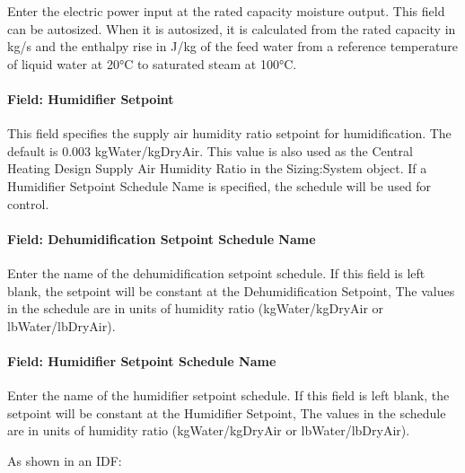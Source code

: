 Enter the electric power input at the rated capacity moisture output. This field can be autosized. When it is autosized, it is calculated from the rated capacity in kg/s and the enthalpy rise in J/kg of the feed water from a reference temperature of liquid water at 20°C to saturated steam at 100°C.

\paragraph{Field: Humidifier Setpoint}\label{field-humidifier-setpoint-4}

This field specifies the supply air humidity ratio setpoint for humidification. The default is 0.003 kgWater/kgDryAir. This value is also used as the Central Heating Design Supply Air Humidity Ratio in the Sizing:System object. If a Humidifier Setpoint Schedule Name is specified, the schedule will be used for control.

\paragraph{Field: Dehumidification Setpoint Schedule Name}\label{field-dehumidification-setpoint-schedule-name}

Enter the name of the dehumidification setpoint schedule. If this field is left blank, the setpoint will be constant at the Dehumidification Setpoint, The values in the schedule are in units of humidity ratio (kgWater/kgDryAir or lbWater/lbDryAir).

\paragraph{Field: Humidifier Setpoint Schedule Name}\label{field-humidifier-setpoint-schedule-name}

Enter the name of the humidifier setpoint schedule. If this field is left blank, the setpoint will be constant at the Humidifier Setpoint, The values in the schedule are in units of humidity ratio (kgWater/kgDryAir or lbWater/lbDryAir).

As shown in an IDF:

